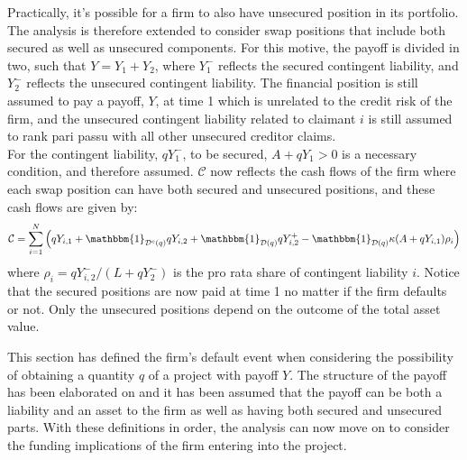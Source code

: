 \documentclass[../main.tex]{subfiles}
\begin{document}
        Practically, it's possible for a firm to also have unsecured position in its portfolio.
        The analysis is therefore extended to consider swap positions that include both secured as well as unsecured components.
        For this motive, the payoff is divided in two, such that $Y=Y_1 + Y_2$, where $Y_1^{-}$ reflects the secured contingent liability, and $Y_2^{-}$ reflects the unsecured contingent liability.
        The financial position is still assumed to pay a payoff, $Y$, at time 1 which is unrelated to the credit risk of the firm, and the unsecured contingent liability related to claimant $i$ is still assumed to rank pari passu with all other unsecured creditor claims.\\
        For the contingent liability, $qY_1^{-}$, to be secured, $A+qY_1 > 0$ is a necessary condition, and therefore assumed.
        $\mathcal{C}$ now reflects the cash flows of the firm where each swap position can have both secured and unsecured positions, and these cash flows are given by:
        \begin{equation}
            \mathcal{C} =
            \sum_{i=1}^{N} \left(
                q Y_{i,1}
                + \mathbbm{1}_{\mathcal{D}^{c}(q)} qY_{i,2}
                + \mathbbm{1}_{\mathcal{D}(q)} qY_{i,2}^{+}
                - \mathbbm{1}_{\mathcal{D}(q)} \kappa (A + qY_{i,1}) \rho_{i}
            \right)
        \end{equation}
        where $\rho_{i} = qY_{i,2}^{-}/(L + qY_{2}^{-})$ is the pro rata share of contingent liability $i$. Notice that the secured positions are now paid at time 1 no matter if the firm defaults or not. Only the unsecured positions depend on the outcome of the total asset value.

        This section has defined the firm's default event when considering the possibility
        of obtaining a quantity $q$ of a project with payoff $Y$.
        The structure of the payoff has been elaborated on
        and it has been assumed that the payoff can be both a liability and an asset to the firm
        as well as having both secured and unsecured parts.
        With these definitions in order, the analysis can now move on to consider the
        funding implications of the firm entering into the project.
        
\end{document}
